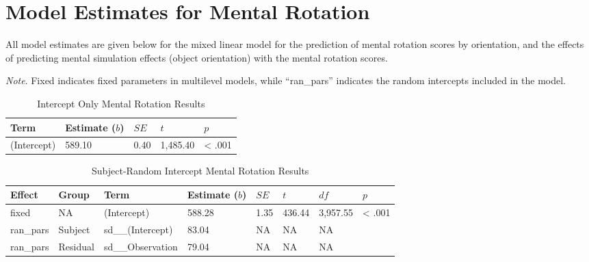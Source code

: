 \documentclass[
  man,floatsintext]{apa7}
\begin{document}
\hypertarget{model-estimates-for-mental-rotation}{%
\section{Model Estimates for Mental Rotation}\label{model-estimates-for-mental-rotation}}

All model estimates are given below for the mixed linear model for the prediction of mental rotation scores by orientation, and the effects of predicting mental simulation effects (object orientation) with the mental rotation scores.

\emph{Note}. Fixed indicates fixed parameters in multilevel models, while ``ran\_pars'' indicates the random intercepts included in the model.

\newpage

\begin{table}[tbp]

\begin{center}
\begin{threeparttable}

\caption{\label{tab:intercept_e}Intercept Only Mental Rotation Results}

\begin{tabular}{lllll}
\toprule
Term & Estimate ($b$) & $SE$ & $t$ & $p$\\
\midrule
(Intercept) & 589.10 & 0.40 & 1,485.40 & < .001\\
\bottomrule
\end{tabular}

\end{threeparttable}
\end{center}

\end{table}

\begin{table}[tbp]

\begin{center}
\begin{threeparttable}

\caption{\label{tab:subject_e}Subject-Random Intercept Mental Rotation Results}

\begin{tabular}{llllllll}
\toprule
Effect & Group & Term & Estimate ($b$) & $SE$ & $t$ & $df$ & $p$\\
\midrule
fixed & NA & (Intercept) & 588.28 & 1.35 & 436.44 & 3,957.55 & < .001\\
ran\_pars & Subject & sd\_\_(Intercept) & 83.04 & NA & NA & NA & \\
ran\_pars & Residual & sd\_\_Observation & 79.04 & NA & NA & NA & \\
\bottomrule
\end{tabular}

\end{threeparttable}
\end{center}

\end{table}
\end{document}
